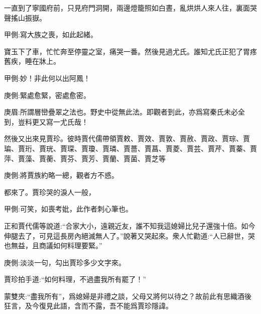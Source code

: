 \begin{parag}
    一直到了寧國府前，只見府門洞開，兩邊燈籠照如白晝，亂烘烘人來人往，裏面哭聲搖山振嶽。\begin{note}甲側:寫大族之喪，如此起緒。\end{note}寶玉下了車，忙忙奔至停靈之室，痛哭一番。然後見過尤氏。誰知尤氏正犯了胃疼舊疾，睡在牀上。\begin{note}甲側:妙！非此何以出阿鳳！\end{note}\begin{note}庚側:緊處愈緊，密處愈密。\end{note}\begin{note}庚眉:所謂層巒疊翠之法也。野史中從無此法。即觀者到此，亦爲寫秦氏未必全到，豈料更又寫一尤氏哉！\end{note}然後又出來見賈珍。彼時賈代儒帶領賈敕、賈效、賈敦、賈赦、賈政、賈琮、賈㻞、賈珩、賈珖、賈琛、賈瓊、賈璘、賈薔、賈菖、賈菱、賈芸、賈芹、賈蓁、賈萍、賈藻、賈蘅、賈芬、賈芳、賈蘭、賈菌、賈芝等\begin{note}庚側:將賈族約略一總，觀者方不惑。\end{note}都來了。賈珍哭的淚人一般，\begin{note}甲側:可笑，如喪考妣，此作者刺心筆也。\end{note}正和賈代儒等說道:“合家大小，遠親近友，誰不知我這媳婦比兒子還強十倍。如今伸腿去了，可見這長房內絕滅無人了。”說著又哭起來。衆人忙勸道:“人已辭世，哭也無益，且商議如何料理要緊。”\begin{note}庚側:淡淡一句，勾出賈珍多少文字來。\end{note}賈珍拍手道:“如何料理，不過盡我所有罷了！”\begin{note}蒙雙夾:“盡我所有”，爲媳婦是非禮之談，父母又將何以待之？故前此有思織酒後狂言，及今復見此語，含而不露，吾不能爲賈珍隱諱。\end{note}
\end{parag}


